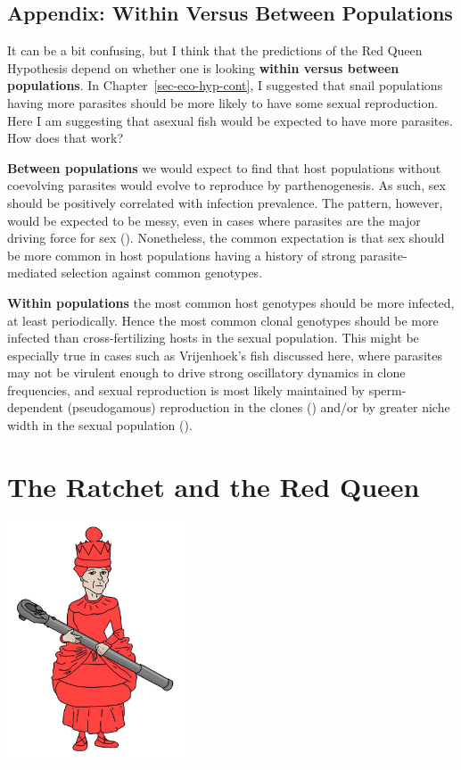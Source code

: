 \documentclass[
  letterpaper,
]{book}
\begin{document}
\section{Appendix: Within Versus Between Populations}\label{sec-app-5}

It can be a bit confusing, but I think that the predictions of the Red
Queen Hypothesis depend on whether one is looking \textbf{within versus
between populations}. In Chapter~\ref{sec-eco-hyp-cont}, I suggested
that snail populations having more parasites should be more likely to
have some sexual reproduction. Here I am suggesting that asexual fish
would be expected to have more parasites. How does that work?

\textbf{Between populations} we would expect to find that host
populations without coevolving parasites would evolve to reproduce by
parthenogenesis. As such, sex should be positively correlated with
infection prevalence. The pattern, however, would be expected to be
messy, even in cases where parasites are the major driving force for sex
(). Nonetheless,
the common expectation is that sex should be more common in host
populations having a history of strong parasite-mediated selection
against common genotypes.

\textbf{Within populations} the most common host genotypes should be
more infected, at least periodically. Hence the most common clonal
genotypes should be more infected than cross-fertilizing hosts in the
sexual population. This might be especially true in cases such as
Vrijenhoek's fish discussed here, where parasites may not be virulent
enough to drive strong oscillatory dynamics in clone frequencies, and
sexual reproduction is most likely maintained by sperm-dependent
(pseudogamous) reproduction in the clones
() and/or by greater niche
width in the sexual population ().


\chapter{The Ratchet and the Red Queen}\label{sec-chap6}

\begin{center}
\includegraphics[width=0.4\textwidth,height=\textheight]{images/fig6-1.jpeg}
\end{center}
\end{document}
